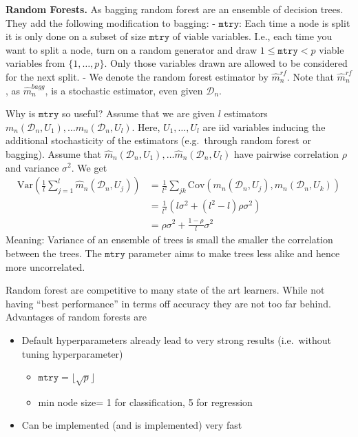 \documentclass[
]{book}
\providecommand{\tightlist}{%
  \setlength{\itemsep}{0pt}\setlength{\parskip}{0pt}}
\begin{document}
\textbf{Random Forests.} As bagging random forest are an ensemble of decision trees. They add the following modification to bagging:
- \(\texttt{mtry}\): Each time a node is split it is only done on a subset of size \(\texttt{mtry}\) of viable variables. I.e., each time you want to split a node, turn on a random generator and draw \(1\leq\texttt{mtry}<p\) viable variables from \(\{1,\dots,p\}\). Only those variables drawn are allowed to be considered for the next split.
- We denote the random forest estimator by \(\hat m^{rf}_n\). Note that \(\hat m^{rf}_n\), as \(\hat m^{bagg}_n\), is a stochastic estimator, even given \(\mathcal D_n\).

Why is \(\texttt{mtry}\) so useful? Assume that we are given \(l\) estimators \(m_n(\mathcal D_n, U_1), \dots m_n(\mathcal D_n, U_l)\). Here, \(U_1,\dots, U_l\) are iid variables inducing the additional stochasticity of the estimators (e.g.~through random forest or bagging). Assume that \(\hat m_n(\mathcal D_n, U_1), \dots \hat m_n(\mathcal D_n, U_l)\) have pairwise correlation \(\rho\) and variance \(\sigma^2\). We get
\begin{align*}
\textrm{Var}\left (\frac 1 l \sum_{j=1}^l \hat m_n(\mathcal D_n, U_j)\right)&= \frac 1 {l^2} \sum_{jk} \textrm{Cov}(m_n(\mathcal D_n, U_j),m_n(\mathcal D_n, U_k))\\&=\frac 1 {l^2} \left( l\sigma^2+ (l^2-l)\rho\sigma^2\right)\\&= \rho \sigma^2 + \frac{1-\rho}{l}\sigma^2
\end{align*}
Meaning: Variance of an ensemble of trees is small the smaller the correlation between the trees. The \(\texttt{mtry}\) parameter aims to make trees less alike and hence more uncorrelated.

Random forest are competitive to many state of the art learners. While not having ``best performance'' in terms off accuracy they are not too far behind. Advantages of random forests are

\begin{itemize}
\tightlist
\item
  Default hyperparameters already lead to very strong results (i.e.~without tuning hyperparameter)

  \begin{itemize}
  \tightlist
  \item
    \(\texttt {mtry}=\lfloor \sqrt{p}\rfloor\)
  \item
    min node size= 1 for classification, 5 for regression
  \end{itemize}
\item
  Can be implemented (and is implemented) very fast
\end{itemize}
\end{document}
